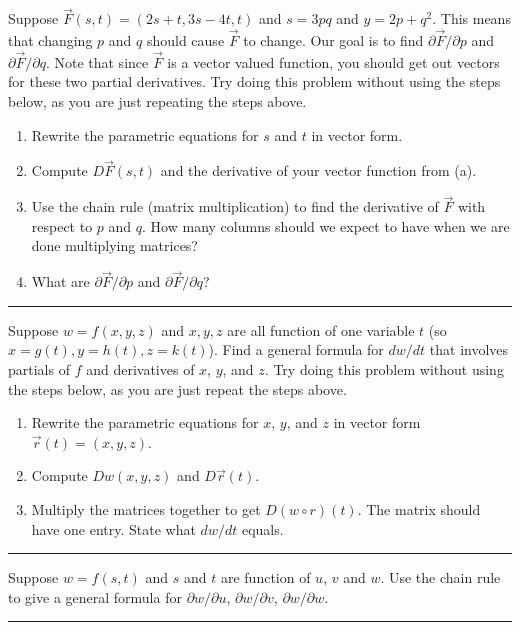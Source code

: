\begin{problem}
 Suppose $\vec F(s,t) = (2s+t,3s-4t,t)$ and $s=3pq$ and $y=2p+q^2$.  This means that changing $p$ and $q$ should cause $\vec F$ to change. Our goal is to find $\partial \vec F/\partial p$ and $\partial \vec F/\partial q$. Note that since $\vec F$ is a vector valued function, you should get out vectors for these two partial derivatives. Try doing this problem without using the steps below, as you are just repeating the steps above.
 \begin{enumerate}
  \item Rewrite the parametric equations for $s$ and $t$ in vector form.
  \item Compute $D\vec F(s,t)$ and the derivative of your vector function from (a).  
  \item Use the chain rule (matrix multiplication) to find the derivative of $\vec F$ with respect to $p$ and $q$.  How many columns should we expect to have when we are done multiplying matrices?
  \item What are $\partial \vec F/\partial p$ and $\partial \vec F/\partial q$? 
 \end{enumerate}
\hrule\end{problem}


\begin{problem}%
 Suppose $w=f(x,y,z)$ and $x,y,z$ are all function of one variable $t$ (so $x=g(t), y=h(t), z=k(t)$).  
 Find a general formula for $dw/dt$ that involves partials of $f$ and derivatives of $x$, $y$, and $z$. Try doing this problem without using the steps below, as you are just repeat the steps above.
\begin{enumerate}
 \item Rewrite the parametric equations for $x$, $y$, and $z$ in vector form $\vec r(t) = (x,y,z)$.
 \item Compute $Dw(x,y,z)$ and $D\vec r(t)$. 
 \item Multiply the matrices together to get $D(w\circ r)(t)$.  The matrix should have one entry. State what $dw/dt$ equals.
\end{enumerate}
\hrule\end{problem}


\begin{problem}
 Suppose $w=f(s,t)$ and $s$ and $t$ are function of $u$, $v$ and $w$.  Use the chain rule to give a general formula for $\partial w/\partial u$, $\partial w/\partial v$, $\partial w/\partial w$. 
\hrule\end{problem}

